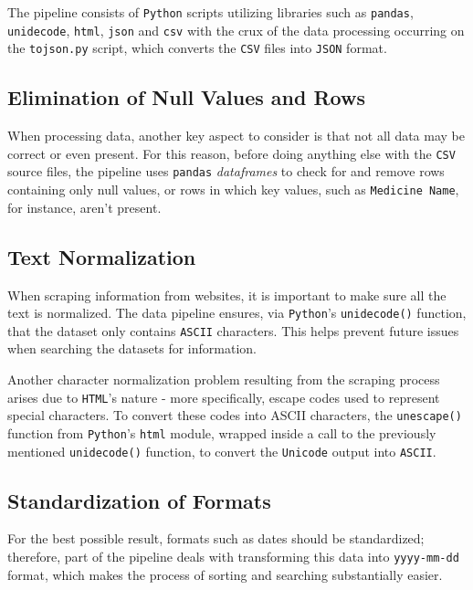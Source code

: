 \documentclass[sigconf]{acmart}
\begin{document}
The pipeline consists of \texttt{Python} scripts utilizing libraries such as \texttt{pandas}, \texttt{unidecode}, \texttt{html}, \texttt{json} and \texttt{csv} with the crux of the data processing occurring on the \texttt{to{\textunderscore}json.py} script, which converts the \texttt{CSV} files into \texttt{JSON} format.

\subsection{Elimination of Null Values and Rows}

When processing data, another key aspect to consider is that not all data may be correct or even present. For this reason, before doing anything else with the \texttt{CSV} source files, the pipeline uses \texttt{pandas} \textit{dataframes} to check for and remove rows containing only null values, or rows in which key values, such as \texttt{Medicine Name}, for instance, aren't present.

\subsection{Text Normalization}

When scraping information from websites, it is important to make sure all the text is normalized. The data pipeline ensures, via \texttt{Python}'s \texttt{unidecode()} function, that the dataset only contains \texttt{ASCII} characters. This helps prevent future issues when searching the datasets for information.

Another character normalization problem resulting from the scraping process arises due to \texttt{HTML}'s nature - more specifically, escape codes used to represent special characters. To convert these codes into ASCII characters, the \texttt{unescape()} function from \texttt{Python}'s \texttt{html} module, wrapped inside a call to the previously mentioned \texttt{unidecode()} function, to convert the \texttt{Unicode} output into \texttt{ASCII}.

\subsection{Standardization of Formats}

For the best possible result, formats such as dates should be standardized; therefore, part of the pipeline deals with transforming this data into \texttt{yyyy-mm-dd} format, which makes the process of sorting and searching substantially easier. 
\end{document}
